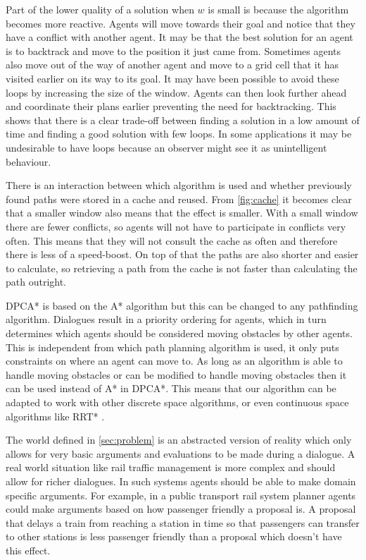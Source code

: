 Part of the lower quality of a solution when $w$ is small is because the
algorithm becomes more reactive. Agents will move towards their goal and notice
that they have a conflict with another agent. It may be that the best solution
for an agent is to backtrack and move to the position it just came from.
Sometimes agents also move out of the way of another agent and move to a grid
cell that it has visited earlier on its way to its goal. It may have been
possible to avoid these loops by increasing the size of the window. Agents can
then look further ahead and coordinate their plans earlier preventing the need
for backtracking. This shows that there is a clear trade-off between finding a
solution in a low amount of time and finding a good solution with few loops. In
some applications it may be undesirable to have loops because an observer might
see it as unintelligent behaviour.


There is an interaction between which algorithm is used and whether previously
found paths were stored in a cache and reused. From \autoref{fig:cache} it
becomes clear that a smaller window also means that the effect is smaller. With
a small window there are fewer conflicts, so agents will not have to
participate in conflicts very often. This means that they will not consult the
cache as often and therefore there is less of a speed-boost. On top of that the
paths are also shorter and easier to calculate, so retrieving a path from the
cache is not faster than calculating the path outright.

DPCA* is based on the A* algorithm \cite{hart1968} but this can be changed to
any pathfinding algorithm. Dialogues result in a priority ordering for agents,
which in turn determines which agents should be considered moving obstacles by
other agents. This is independent from which path planning algorithm is used,
it only puts constraints on where an agent can move to. As long as an algorithm
is able to handle moving obstacles or can be modified to handle moving
obstacles then it can be used instead of A* in DPCA*. This means that our
algorithm can be adapted to work with other discrete space algorithms, or even
continuous space algorithms like RRT* \cite{lavalle1998,lavalle2001}.

The world defined in \autoref{sec:problem} is an abstracted version of reality
which only allows for very basic arguments and evaluations to be made during a
dialogue. A real world situation like rail traffic management is more complex
and should allow for richer dialogues. In such systems agents should be able to
make domain specific arguments. For example, in a public transport rail system
planner agents could make arguments based on how passenger friendly a proposal
is. A proposal that delays a train from reaching a station in time so that
passengers can transfer to other stations is less passenger friendly than a
proposal which doesn't have this effect.

